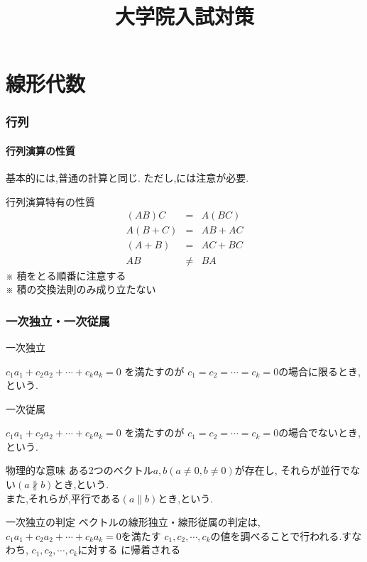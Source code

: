 \documentclass[a4paper]{jsarticle}
\author{}
\title{大学院入試対策}
\date{}
\begin{document}
\maketitle
\tableofcontents
\newpage

\part{線形代数}
\section{行列}
\subsection{行列演算の性質}
基本的には,普通の計算と同じ.
ただし,には注意が必要.
\begin{itembox}[l]{行列演算特有の性質}
    \begin{eqnarray*}
        \left(AB\right)C&=&A\left(BC\right)\\
        A\left(B+C\right)&=&AB+AC\\
        \left(A+B\right)&=&AC+BC\\
        AB&\neq& BA
    \end{eqnarray*}
    ※ 積をとる順番に注意する\\
    ※ 積の交換法則のみ成り立たない
\end{itembox}
\section{一次独立・一次従属}
\begin{itembox}[l]{一次独立}
    \begin{center}
        $c_1a_1+c_2a_2+\cdots+c_ka_k=0$ を満たすのが $c_1=c_2=\cdots=c_k=0$の場合に限るとき,
        という.
    \end{center}
\end{itembox}
\begin{itembox}[l]{一次従属}
    \begin{center}
        $c_1a_1+c_2a_2+\cdots+c_ka_k=0$ を満たすのが $c_1=c_2=\cdots=c_k=0$の場合でないとき,
        という.
    \end{center}
\end{itembox}
\begin{itembox}[l]{物理的な意味}
    ある2つのベクトル$a,b\left(a\neq 0,b\neq 0\right)$が存在し,
    それらが並行でない$\left(a\not\parallel b\right)$とき,という.\\
    また,それらが,平行である$\left(a\parallel b\right)$とき,という.
\end{itembox}
\begin{itembox}[l]{一次独立の判定}
    ベクトルの線形独立・線形従属の判定は,$c_1a_1+c_2a_2+\cdots+c_ka_k=0$を満たす
    $c_1,c_2,\cdots,c_k$の値を調べることで行われる.すなわち, $c_1,c_2,\cdots,c_k$に対する
    に帰着される
\end{itembox}
\end{document}

